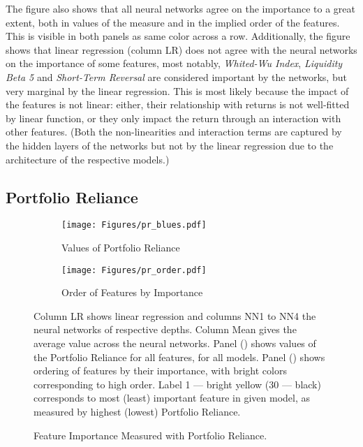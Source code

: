 		The figure also shows that all neural networks agree on the importance to a great extent, both in values of the measure and in the implied order of the features. This is visible in both panels as same color across a row. Additionally, the figure shows that linear regression (column LR) does not agree with the neural networks on the importance of some features, most notably, \textit{Whited-Wu Index}, \textit{Liquidity Beta 5} and \textit{Short-Term Reversal} are considered important by the networks, but very marginal by the linear regression. This is most likely because the impact of the features is not linear: either, their relationship with returns is not well-fitted by linear function, or they only impact the return through an interaction with other features. (Both the non-linearities and interaction terms are captured by the hidden layers of the networks but not by the linear regression due to the architecture of the respective models.)  	
	

	
	\subsection{Portfolio Reliance}
	
		\begin{figure}	
			\centering		
			\begin{subfigure}[t]{\textwidth}
				\texttt{[image: Figures/pr\_blues.pdf]}
				\caption{Values of Portfolio Reliance}
				\label{fig:pr_blues}
			\end{subfigure}
			
			\begin{subfigure}[t]{\textwidth}
				\centering
				\texttt{[image: Figures/pr\_order.pdf]}
				\caption{Order of Features by Importance}
				\label{fig:pr_order}
			\end{subfigure}
			\caption{Feature Importance Measured with Portfolio Reliance.}
			\medskip
			\small
			Column LR shows linear regression and columns NN1 to NN4 the neural networks of respective depths. Column Mean gives the average value across the neural networks. Panel () shows values of the Portfolio Reliance for all features, for all models.  Panel () shows ordering of features by their importance, with bright colors corresponding to high order. Label 1 --- bright yellow (30 --- black) corresponds to most (least) important feature in given model, as measured by highest (lowest) Portfolio Reliance. 
			\label{fig:pr_ensemble}
		\end{figure}
		
